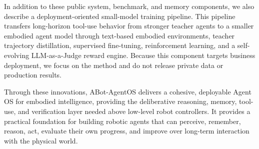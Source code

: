 In addition to these public system, benchmark, and memory components, we also describe a deployment-oriented small-model training pipeline. This pipeline transfers long-horizon tool-use behavior from stronger teacher agents to a smaller embodied agent model through text-based embodied environments, teacher trajectory distillation, supervised fine-tuning, reinforcement learning, and a self-evolving LLM-as-a-Judge reward engine. Because this component targets business deployment, we focus on the method and do not release private data or production results.

Through these innovations, ABot-AgentOS delivers a cohesive, deployable Agent OS for embodied intelligence, providing the deliberative reasoning, memory, tool-use, and verification layer needed above low-level robot controllers. It provides a practical foundation for building robotic agents that can perceive, remember, reason, act, evaluate their own progress, and improve over long-term interaction with the physical world.